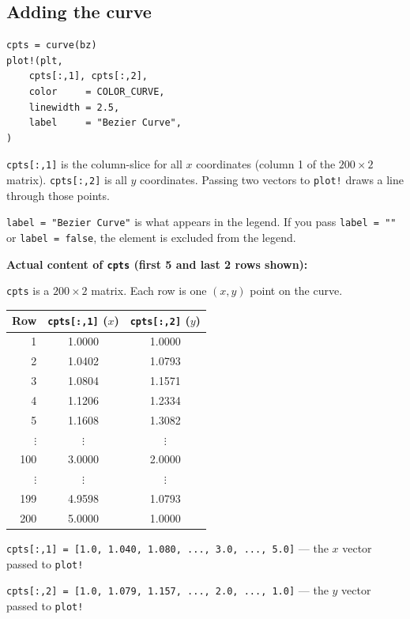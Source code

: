 \documentclass[12pt, a4paper]{article}
\newcommand{\cd}[1]{\texttt{#1}}
\begin{document}
\subsection{Adding the curve}

\begin{verbatim}
cpts = curve(bz)
plot!(plt,
    cpts[:,1], cpts[:,2],
    color     = COLOR_CURVE,
    linewidth = 2.5,
    label     = "Bezier Curve",
)
\end{verbatim}

\cd{cpts[:,1]} is the column-slice for all $x$ coordinates
(column 1 of the $200 \times 2$ matrix).
\cd{cpts[:,2]} is all $y$ coordinates.
Passing two vectors to \cd{plot!} draws a line through
those points.

\cd{label = "Bezier Curve"} is what appears in the legend.
If you pass \cd{label = ""} or \cd{label = false},
the element is excluded from the legend.

\begin{examplebox}
\textbf{Actual content of \cd{cpts} (first 5 and last 2 rows shown):}

\cd{cpts} is a $200 \times 2$ matrix.
Each row is one $(x, y)$ point on the curve.

\medskip
\begin{center}
\begin{tabular}{rcc}
\toprule
Row & \cd{cpts[:,1]} ($x$) & \cd{cpts[:,2]} ($y$) \\
\midrule
1   & 1.0000 & 1.0000 \\
2   & 1.0402 & 1.0793 \\
3   & 1.0804 & 1.1571 \\
4   & 1.1206 & 1.2334 \\
5   & 1.1608 & 1.3082 \\
$\vdots$ & $\vdots$ & $\vdots$ \\
100 & 3.0000 & 2.0000 \\
$\vdots$ & $\vdots$ & $\vdots$ \\
199 & 4.9598 & 1.0793 \\
200 & 5.0000 & 1.0000 \\
\bottomrule
\end{tabular}
\end{center}

\medskip
\cd{cpts[:,1] = [1.0, 1.040, 1.080, ..., 3.0, ..., 5.0]}
\quad --- the $x$ vector passed to \cd{plot!}

\cd{cpts[:,2] = [1.0, 1.079, 1.157, ..., 2.0, ..., 1.0]}
\quad --- the $y$ vector passed to \cd{plot!}
\end{examplebox}
\end{document}
